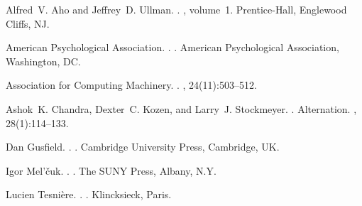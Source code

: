 \documentclass[11pt]{article}
\begin{document}
%
%

\begin{thebibliography}{}

Alfred~V. Aho and Jeffrey~D. Ullman.
.
, volume~1.
\newblock Prentice-{Hall}, Englewood Cliffs, NJ.

{American Psychological Association}.
.
.
\newblock American Psychological Association, Washington, DC.

{Association for Computing Machinery}.
.
, 24(11):503--512.

Ashok~K. Chandra, Dexter~C. Kozen, and Larry~J. Stockmeyer.
.
\newblock Alternation.
,
  28(1):114--133.

Dan Gusfield.
.
.
\newblock Cambridge University Press, Cambridge, UK.

Igor Mel'\v{c}uk.
.
.
\newblock The SUNY Press, Albany, N.Y.

Lucien Tesni\`{e}re.
.
.
\newblock Klincksieck, Paris.

\end{thebibliography}
\end{document}
